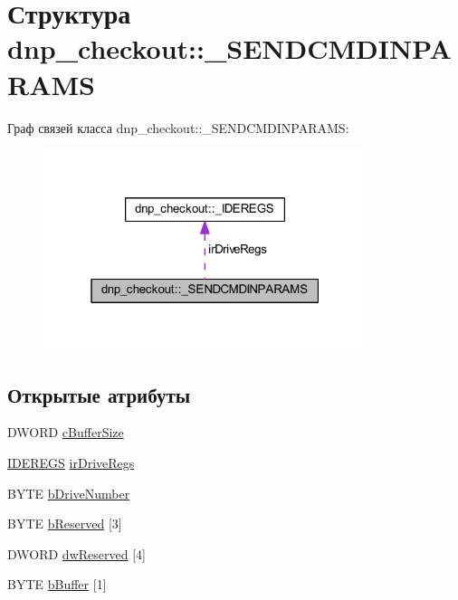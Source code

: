 \hypertarget{structdnp__checkout_1_1___s_e_n_d_c_m_d_i_n_p_a_r_a_m_s}{\section{Структура dnp\-\_\-checkout\-:\-:\-\_\-\-S\-E\-N\-D\-C\-M\-D\-I\-N\-P\-A\-R\-A\-M\-S}
\label{structdnp__checkout_1_1___s_e_n_d_c_m_d_i_n_p_a_r_a_m_s}
}


Граф связей класса dnp\-\_\-checkout\-:\-:\-\_\-\-S\-E\-N\-D\-C\-M\-D\-I\-N\-P\-A\-R\-A\-M\-S\-:
\nopagebreak
\begin{figure}[H]
\begin{center}
\leavevmode
\includegraphics[width=268pt]{structdnp__checkout_1_1___s_e_n_d_c_m_d_i_n_p_a_r_a_m_s__coll__graph}
\end{center}
\end{figure}
\subsection*{Открытые атрибуты}
\begin{DoxyCompactItemize}
\item 
D\-W\-O\-R\-D \hyperlink{structdnp__checkout_1_1___s_e_n_d_c_m_d_i_n_p_a_r_a_m_s_a6746427c1348cf6c8caf775d740b0b6e}{c\-Buffer\-Size}
\item 
\hyperlink{namespacednp__checkout_ad6ca05b19c9b8b1d79306987d943d841}{I\-D\-E\-R\-E\-G\-S} \hyperlink{structdnp__checkout_1_1___s_e_n_d_c_m_d_i_n_p_a_r_a_m_s_ae8fed6d1ba296a07a93f0d0804f5a7ce}{ir\-Drive\-Regs}
\item 
B\-Y\-T\-E \hyperlink{structdnp__checkout_1_1___s_e_n_d_c_m_d_i_n_p_a_r_a_m_s_a92c04dce74c5ddb89d17844726031349}{b\-Drive\-Number}
\item 
B\-Y\-T\-E \hyperlink{structdnp__checkout_1_1___s_e_n_d_c_m_d_i_n_p_a_r_a_m_s_a579a92fced06869a0fb62a8679ce8b2d}{b\-Reserved} \mbox{[}3\mbox{]}
\item 
D\-W\-O\-R\-D \hyperlink{structdnp__checkout_1_1___s_e_n_d_c_m_d_i_n_p_a_r_a_m_s_a780a17af012cf9a376bcfa4411c3d037}{dw\-Reserved} \mbox{[}4\mbox{]}
\item 
B\-Y\-T\-E \hyperlink{structdnp__checkout_1_1___s_e_n_d_c_m_d_i_n_p_a_r_a_m_s_a1d496c0bac30e1c4ba551ec6ba6eaeac}{b\-Buffer} \mbox{[}1\mbox{]}
\end{DoxyCompactItemize}


